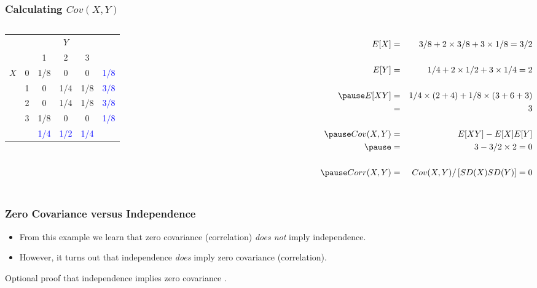 \documentclass[handout]{beamer}
\begin{document}
\begin{frame}
\frametitle{Calculating $Cov(X,Y)$}

\begin{columns}

\begin{table}
\footnotesize
\begin{tabular}{|cc|ccc|c|}
\hline
&&\multicolumn{3}{c|}{$Y$}&\\
&&1 & 2&3&\\
\hline
\multirow{4}{*}{$X$}
&0& \multicolumn{1}{|c}{\alert{1/8}} & \alert{0}& \alert{0}&\textcolor{blue}{1/8}\\
&1& \multicolumn{1}{|c}{\alert{0}} & \alert{1/4}&\alert{1/8}&\textcolor{blue}{3/8}\\
&2& \multicolumn{1}{|c}{\alert{0}} & \alert{1/4}&\alert{1/8}&\textcolor{blue}{3/8}\\
&3& \multicolumn{1}{|c}{\alert{1/8}} & \alert{0}&\alert{0}&\textcolor{blue}{1/8}\\
\hline
&&\textcolor{blue}{1/4}&\textcolor{blue}{1/2}&\textcolor{blue}{1/4}&\\
\hline
\end{tabular}
\vspace{6em}
\end{table}


\footnotesize
\begin{eqnarray*}
	E[X] &=&3/8 + 2 \times 3/8 + 3 \times 1/8 = 3/2\\\\ 
	E[Y] &=&1/4 + 2 \times 1/2 + 3 \times 1/4 = 2 \\ \\ \pause
	E[XY] &=& 1/4\times ( 2 + 4) + 1/8 \times (3 + 6 + 3)\\ 
		&=& 3\\ \\ \pause
	Cov(X,Y) &=& E[XY] - E[X]E[Y]\\ \pause
			&=& 3 - 3/2\times 2 = 0\\\\ \pause
	Corr(X,Y) &=& Cov(X,Y)/\left[SD(X) SD(Y) \right] = 0
\end{eqnarray*}

\end{columns}

\end{frame}
\begin{frame}
  \frametitle{Zero Covariance versus Independence}
  \begin{itemize}
    \item From this example we learn that zero covariance (correlation) \emph{does not} imply independence.
    \item However, it turns out that independence \emph{does} imply zero covariance (correlation).
  \end{itemize}

\vspace{2em}
\normalsize 
Optional proof that independence implies zero covariance \textcolor{blue}{\href{http://ditraglia.com/Econ103Public/OptionalProofs.pdf}{}}.
\end{frame}
\end{document}
